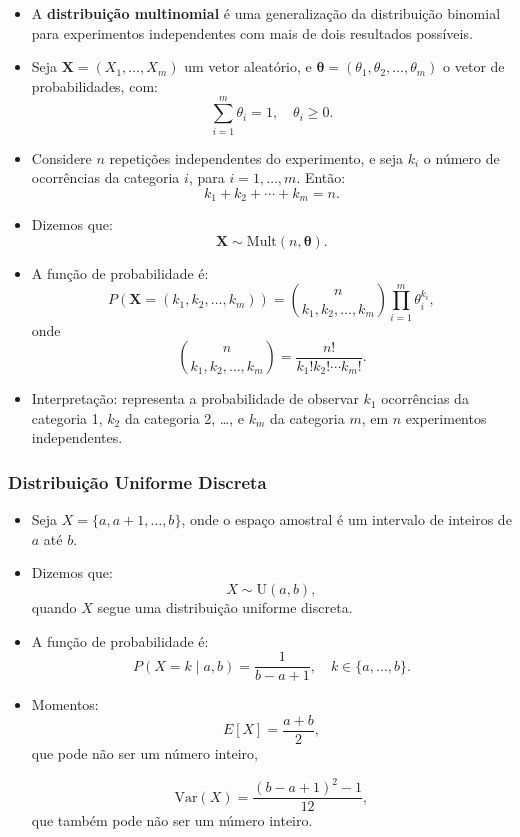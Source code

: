 \documentclass[
  letterpaper,
  DIV=11,
  numbers=noendperiod]{scrreprt}
\begin{document}
\begin{itemize}
\item
  A \textbf{distribuição multinomial} é uma generalização da
  distribuição binomial para experimentos independentes com mais de dois
  resultados possíveis.
\item
  Seja \(\mathbf{X} = (X_1, \dots, X_m)\) um vetor aleatório, e
  \(\boldsymbol{\theta} = (\theta_1, \theta_2, \dots, \theta_m)\) o
  vetor de probabilidades, com:
  \[\sum_{i=1}^m \theta_i = 1, \quad \theta_i \geq 0.\]
\item
  Considere \(n\) repetições independentes do experimento, e seja
  \(k_i\) o número de ocorrências da categoria \(i\), para
  \(i = 1, \dots, m\). Então: \[k_1 + k_2 + \cdots + k_m = n.\]
\item
  Dizemos que: \[\mathbf{X} \sim \text{Mult}(n, \boldsymbol{\theta}).\]
\item
  A função de probabilidade é: \[P(\mathbf{X} = (k_1, k_2, \dots, k_m))
  =
  \binom{n}{k_1, k_2, \dots, k_m}
  \prod_{i=1}^m \theta_i^{k_i},\] onde \[\binom{n}{k_1, k_2, \dots, k_m}
  =
  \frac{n!}{k_1!k_2!\cdots k_m!}.\]
\item
  Interpretação: representa a probabilidade de observar \(k_1\)
  ocorrências da categoria 1, \(k_2\) da categoria 2, \ldots, e \(k_m\)
  da categoria \(m\), em \(n\) experimentos independentes.
\end{itemize}

\subsubsection*{Distribuição Uniforme
Discreta}\label{distribuiuxe7uxe3o-uniforme-discreta}

\begin{itemize}
\item
  Seja \(X = \{a, a+1, \dots, b\}\), onde o espaço amostral é um
  intervalo de inteiros de \(a\) até \(b\).
\item
  Dizemos que: \[X \sim \text{U}(a, b),\] quando \(X\) segue uma
  distribuição uniforme discreta.
\item
  A função de probabilidade é:
  \[P(X = k \mid a, b) = \frac{1}{b - a + 1}, \quad k \in \{a, \dots, b\}.\]
\item
  Momentos: \[E[X] = \frac{a + b}{2},\] que pode não ser um número
  inteiro,

  \[\text{Var}(X) = \frac{(b - a + 1)^2 - 1}{12},\] que também pode não
  ser um número inteiro.
\end{itemize}
\end{document}
